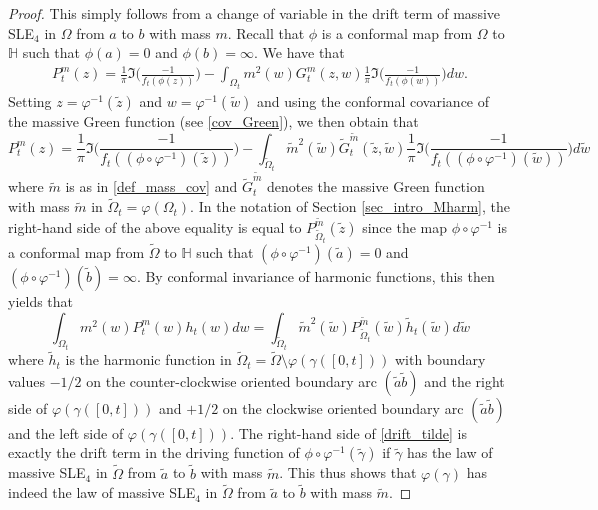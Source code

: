 \documentclass{article}
\newcommand{\HH}{{\mathbb{H}}}
\theoremstyle{definition}
\theoremstyle{remark}
\theoremstyle{remark}
\begin{document}
\begin{proof}
This simply follows from a change of variable in the drift term of massive SLE$_4$ in $\Omega$ from $a$ to $b$ with mass $m$. Recall that $\phi$ is a conformal map from $\Omega$ to $\HH$ such that $\phi(a)=0$ and $\phi(b)=\infty$. We have that
\begin{align*}
    P_t^m(z) = \frac{1}{\pi}\Im \bigg( \frac{-1}{f_t(\phi(z))}\bigg) - \int_{\Omega_t} m^2(w) G_t^m(z,w) \frac{1}{\pi}\Im \bigg( \frac{-1}{f_t(\phi(w))}\bigg) dw.
\end{align*}
Setting $z = \varphi^{-1}(\tilde z)$ and $w = \varphi^{-1}(\tilde w)$ and using the conformal covariance of the massive Green function (see \eqref{cov_Green}), we then obtain that
\begin{equation*}
    P_t^m(z) = \frac{1}{\pi}\Im \bigg( \frac{-1}{f_t((\phi \circ \varphi^{-1})(\tilde z))}\bigg) - \int_{\tilde \Omega_t} \tilde m^2(\tilde w) \tilde G_t^{\tilde m}(\tilde z, \tilde w) \frac{1}{\pi}\Im \bigg( \frac{-1}{f_t((\phi \circ \varphi^{-1})(\tilde w))}\bigg) d\tilde w
\end{equation*}
where $\tilde m$ is as in \eqref{def_mass_cov} and $\tilde G_t^{\tilde m}$ denotes the massive Green function with mass $\tilde m$ in $\tilde \Omega_{t} = \varphi(\Omega_t)$. In the notation of Section \ref{sec_intro_Mharm}, the right-hand side of the above equality is equal to $P_{\tilde \Omega_t}^{\tilde m}(\tilde z)$ since the map $\phi \circ \varphi^{-1}$ is a conformal map from $\tilde \Omega$ to $\HH$ such that $(\phi \circ \varphi^{-1})(\tilde a)=0$ and $(\phi \circ \varphi^{-1})(\tilde b)=\infty$. By conformal invariance of harmonic functions, this then yields that
\begin{equation} \label{drift_tilde}
    \int_{\Omega_t} m^2(w)P_t^m(w)h_t(w) dw = \int_{\tilde \Omega_t} \tilde m^2(\tilde w)P_{\tilde \Omega_t}^{\tilde m}(\tilde w)\tilde h_t(\tilde w) d\tilde w
\end{equation}
where $\tilde h_t$ is the harmonic function in $\tilde \Omega_t = \tilde \Omega \setminus \varphi(\gamma([0,t]))$ with boundary values $-1/2$ on the counter-clockwise oriented boundary arc $(\tilde a \tilde b)$ and the right side of $\varphi(\gamma([0,t]))$ and $+1/2$ on the clockwise oriented boundary arc $(\tilde a \tilde b)$ and the left side of $\varphi(\gamma([0,t]))$. The right-hand side of \eqref{drift_tilde} is exactly the drift term in the driving function of $\phi \circ \varphi^{-1}(\tilde \gamma)$ if $\tilde \gamma$ has the law of massive SLE$_4$ in $\tilde \Omega$ from $\tilde a$ to $\tilde b$ with mass $\tilde m$. This thus shows that $\varphi(\gamma)$ has indeed the law of massive SLE$_4$ in $\tilde \Omega$ from $\tilde a$ to $\tilde b$ with mass $\tilde m$.
\end{proof}
\end{document}
